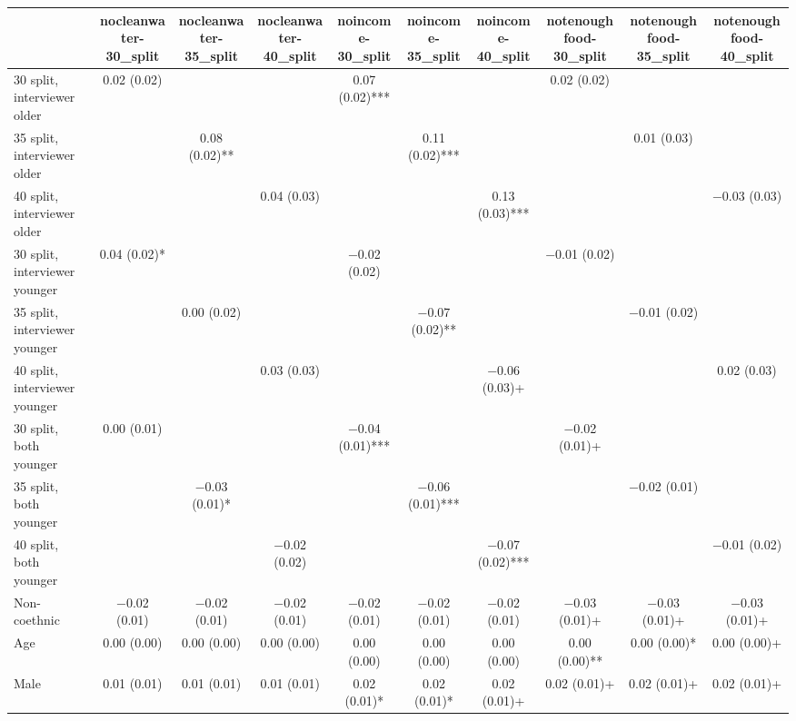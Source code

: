 \begin{table}[H]
\centering
\fontsize{7}{9}\selectfont
\begin{tabular}[t]{lccccccccc}
\toprule
  & nocleanwater-30\_split & nocleanwater-35\_split & nocleanwater-40\_split & noincome-30\_split & noincome-35\_split & noincome-40\_split & notenoughfood-30\_split & notenoughfood-35\_split & notenoughfood-40\_split\\
\midrule
30 split, interviewer older & \num{0.02} (\num{0.02}) &  &  & \num{0.07} (\num{0.02})*** &  &  & \num{0.02} (\num{0.02}) &  & \\
35 split, interviewer older &  & \num{0.08} (\num{0.02})** &  &  & \num{0.11} (\num{0.02})*** &  &  & \num{0.01} (\num{0.03}) & \\
40 split, interviewer older &  &  & \num{0.04} (\num{0.03}) &  &  & \num{0.13} (\num{0.03})*** &  &  & \num{-0.03} (\num{0.03})\\
30 split, interviewer younger & \num{0.04} (\num{0.02})* &  &  & \num{-0.02} (\num{0.02}) &  &  & \num{-0.01} (\num{0.02}) &  & \\
35 split, interviewer younger &  & \num{0.00} (\num{0.02}) &  &  & \num{-0.07} (\num{0.02})** &  &  & \num{-0.01} (\num{0.02}) & \\
40 split, interviewer younger &  &  & \num{0.03} (\num{0.03}) &  &  & \num{-0.06} (\num{0.03})+ &  &  & \num{0.02} (\num{0.03})\\
30 split, both younger & \num{0.00} (\num{0.01}) &  &  & \num{-0.04} (\num{0.01})*** &  &  & \num{-0.02} (\num{0.01})+ &  & \\
35 split, both younger &  & \num{-0.03} (\num{0.01})* &  &  & \num{-0.06} (\num{0.01})*** &  &  & \num{-0.02} (\num{0.01}) & \\
40 split, both younger &  &  & \num{-0.02} (\num{0.02}) &  &  & \num{-0.07} (\num{0.02})*** &  &  & \num{-0.01} (\num{0.02})\\
Non-coethnic & \num{-0.02} (\num{0.01}) & \num{-0.02} (\num{0.01}) & \num{-0.02} (\num{0.01}) & \num{-0.02} (\num{0.01}) & \num{-0.02} (\num{0.01}) & \num{-0.02} (\num{0.01}) & \num{-0.03} (\num{0.01})+ & \num{-0.03} (\num{0.01})+ & \num{-0.03} (\num{0.01})+\\
Age & \num{0.00} (\num{0.00}) & \num{0.00} (\num{0.00}) & \num{0.00} (\num{0.00}) & \num{0.00} (\num{0.00}) & \num{0.00} (\num{0.00}) & \num{0.00} (\num{0.00}) & \num{0.00} (\num{0.00})** & \num{0.00} (\num{0.00})* & \num{0.00} (\num{0.00})+\\
Male & \num{0.01} (\num{0.01}) & \num{0.01} (\num{0.01}) & \num{0.01} (\num{0.01}) & \num{0.02} (\num{0.01})* & \num{0.02} (\num{0.01})* & \num{0.02} (\num{0.01})+ & \num{0.02} (\num{0.01})+ & \num{0.02} (\num{0.01})+ & \num{0.02} (\num{0.01})+\\

\end{tabular}
\end{table}

